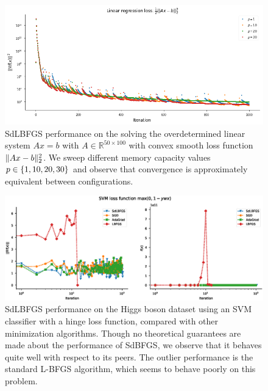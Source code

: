 \documentclass{article}
\newcommand{\RR}{\mathbb{R}}
\DeclarePairedDelimiter{\norm}{\|}{\|}
\DeclarePairedDelimiter{\set}{\{}{\}}
\begin{document}
\begin{figure}[h]
  \centering
  \includegraphics[width=\textwidth]{../plots/linear_system_loss}
  \caption{
    SdLBFGS performance on the solving the overdetermined linear system
    $Ax = b$ with $A \in \RR^{50 \times 100}$ with convex smooth loss function
    $\norm{Ax-b}_2^2$. We sweep different memory capacity values $p \in
    \set{1,10,20,30}$ and observe that convergence is approximately equivalent
    between configurations.
  }
  \label{fig:convex-linear-system}
\end{figure}

\begin{figure}[h]
  \centering
  \includegraphics[width=\textwidth]{../plots/svm_hinge_loss.eps}
  \caption{
    SdLBFGS performance on the Higgs boson dataset using an SVM classifier with
    a hinge loss function, compared with other minimization algorithms. Though
    no theoretical guarantees are made about the performance of SdBFGS, we
    observe that it behaves quite well with respect to its peers. The outlier
    performance is the standard L-BFGS algorithm, which seems to behave poorly
    on this problem.
  }
  \label{fig:svm-hinge}
\end{figure}
\end{document}
